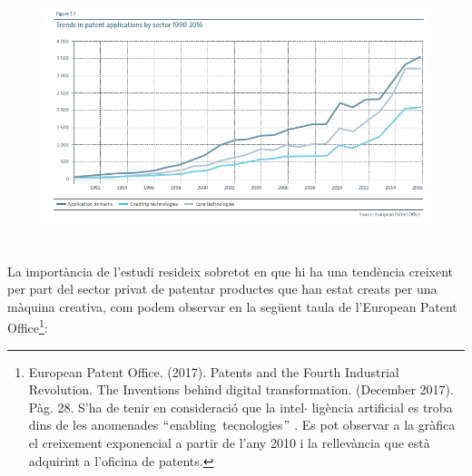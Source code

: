 \documentclass[12pt]{article}
\renewcommand{\_}{\kern-1.5pt\textunderscore\kern-1.5pt}
\begin{document}
\begin{itemize}
\vspace{\baselineskip}



\begin{figure}[H]
\advance\leftskip -0.22in		\includegraphics[width=6.0in,height=3.0in]{./media/image3.png}
\end{figure}



\begin{justify}
La importància de l’estudi resideix sobretot en que hi ha una tendència creixent per part del sector privat de patentar productes que han estat creats per una màquina creativa, com podem observar en la següent taula de l’European Patent Office\footnote{ European Patent Office. (2017). Patents and the Fourth Industrial Revolution. The Inventions behind digital transformation. (December 2017). Pàg. 28. S’ha de tenir en consideració que la intel$ \cdot $ ligència artificial es troba dins de les anomenades $``$enabling\ tecnologies$"$ . Es pot observar  a la gràfica el creixement exponencial a partir de l’any 2010 i la rellevància que està adquirint a l’oficina de patents.  }:
\end{justify}\par



\end{itemize}
\end{document}
